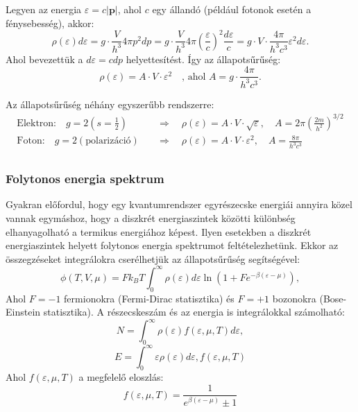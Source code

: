 \documentclass[../main.tex]{subfiles}
\begin{document}
Legyen az energia $\varepsilon = c |\mathbf{p}|$, ahol $c$ egy állandó (például fotonok esetén a fénysebesség), akkor:
\begin{equation}
    \rho(\varepsilon) d\varepsilon = g \cdot \frac{V}{h^3} 4 \pi p^2 dp = g \cdot \frac{V}{h^3} 4 \pi \left( \frac{\varepsilon}{c} \right)^2 \frac{d\varepsilon}{c} = g \cdot V \cdot \frac{4 \pi}{h^3 c^3} \varepsilon^2 d\varepsilon.
\end{equation}
Ahol bevezettük a $d\varepsilon = c dp$ helyettesítést. Így az állapotsűrűség:
\begin{equation}
    \boxed{
    \rho(\varepsilon) = A \cdot V \cdot \varepsilon^2 \quad \text{, ahol } A = g \cdot \frac{4 \pi}{h^3 c^3}.
    }
\end{equation}

Az állapotsűrűség néhány egyszerűbb rendszerre:
\begin{equation}
    \begin{aligned}
        \text{Elektron:} \quad g = 2 (s = \frac{1}{2}) & \quad \Rightarrow \quad \rho(\varepsilon) = A \cdot V \cdot \sqrt{\varepsilon}, \quad A = 2 \pi \left(\frac{2m}{h^2}\right)^{3/2} \\
        \text{Foton:} \quad g = 2 (\text{polarizáció}) & \quad \Rightarrow \quad \rho(\varepsilon) = A \cdot V \cdot \varepsilon^2, \quad A = \frac{8 \pi}{h^3 c^3} \\
    \end{aligned}
\end{equation}

\subsubsection{Folytonos energia spektrum}
Gyakran előfordul, hogy egy kvantumrendszer egyrészecske energiái annyira közel vannak egymáshoz, hogy a diszkrét energiaszintek közötti különbség elhanyagolható a termikus energiához képest.
Ilyen esetekben a diszkrét energiaszintek helyett folytonos energia spektrumot feltételezhetünk. Ekkor az összegzéseket integrálokra cserélhetjük az állapotsűrűség segítségével:
\begin{equation}
    \phi (T, V, \mu) = F k_B T \int_0^{\infty} \rho(\varepsilon)d\varepsilon \ln \left( 1 + F e^{-\beta (\varepsilon - \mu)} \right),
\end{equation}
Ahol $F = -1$ fermionokra (Fermi-Dirac statisztika) és $F = +1$ bozonokra (Bose-Einstein statisztika). A részecskeszám és az energia is integrálokkal számolható:
\begin{equation}
    N = \int_0^{\infty} \rho(\varepsilon) f(\varepsilon, \mu, T) d\varepsilon,
\end{equation}
\begin{equation}
    E = \int_0^{\infty} \varepsilon \rho(\varepsilon) d\varepsilon, f(\varepsilon, \mu, T)
\end{equation}
Ahol $f(\varepsilon, \mu, T)$ a megfelelő eloszlás:
\begin{equation}
    f(\varepsilon, \mu, T) = \frac{1}{e^{\beta (\varepsilon - \mu)} \pm 1}
\end{equation}
\end{document}

